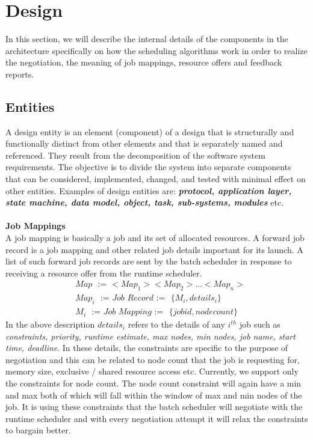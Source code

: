 \chapter{Design}
In this section, we will describe the internal details of the components in the architecture specifically on how the scheduling algorithms work in order to realize the negotiation, the meaning of job mappings, resource offers and feedback reports. 
\label{chapter:ischeduler}
\section{Entities}
A design entity is an element (component) of a design that is structurally and functionally distinct from other elements and that is separately named and referenced. They result from the decomposition of the software system requirements. The objective is to divide the system into separate components that can be considered, implemented, changed, and tested with minimal effect on other entities. Examples of design entities are: \textbf{\textit{protocol, application layer, state machine, data model, object, task, sub-systems, modules}} etc.\\ \\
\textbf{Job Mappings}\\
A job mapping is basically a job and its set of allocated resources. A forward job record is a job mapping and other related job details important for its launch. A list of such forward job records are sent by the batch scheduler in response to receiving a resource offer from the runtime scheduler.\\
\begin{equation*}
\begin{aligned}
&Map\ \ \ \textit{:=\ \ \ {$<Map_{1}><Map_{2}>...<Map_{n}>$}}\\
&Map_{i}\ \ \ \textit{:=\ \ \ Job Record\ \ \ :=}\ \ \ \{M_{i},details_{i}\}\\
&M_{i}\ \ \ \textit{:=\ \ \ Job Mapping\ \ \ :=}\ \ \ \{jobid,node count\}
\end{aligned}
\end{equation*}
In the above description $details_{i}$ refers to the details of any $i^{th}$ job such as \textit{constraints, priority, runtime estimate, max nodes, min nodes, job name, start time, deadline}. In these details, the constraints are specific to the purpose of negotiation and this can be related to node count that the job is requesting for, memory size, exclusive / shared resource access etc. Currently, we support only the constraints for node count. The node count constraint will again have a min and max both of which will fall within the window of max and min nodes of the job. It is using these constraints that the batch scheduler will negotiate with the runtime scheduler and with every negotiation attempt it will relax the constraints to bargain better.\\ \\
